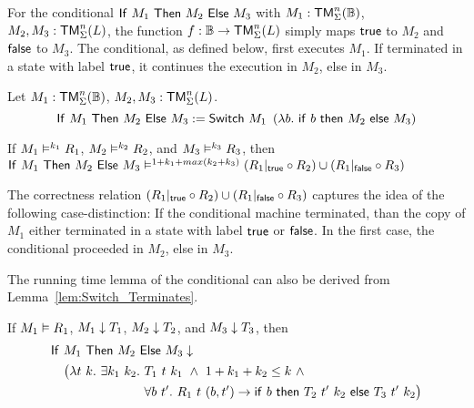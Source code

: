 For the conditional $\mathsf{If}~M_1~\mathsf{Then}~M_2~\mathsf{Else}~M_3$ with $M_1 : \mathsf{TM}_\Sigma^n(\mathbb{B})$, $M_2, M_3 : \mathsf{TM}_\Sigma^n(L)$, the function $f : \mathbb{B} \rightarrow \mathsf{TM}_\Sigma^n(L)$
simply maps $\mathsf{true}$ to $M_2$ and $\mathsf{false}$ to $M_3$.  The conditional, as defined below, first executes $M_1$.  If terminated in a state with label
$\mathsf{true}$, it continues the execution in $M_2$, else in $M_3$.

%
\begin{definition}[Conditional][If]
  \label{def:If}
  Let $M_1 : \mathsf{TM}_\Sigma^n(\mathbb{B})$, $M_2, M_3 : \mathsf{TM}_\Sigma^n(L)$.
  \[
    \mathsf{If}~M_1~\mathsf{Then}~M_2~\mathsf{Else}~M_3 := \mathsf{Switch}~M_1~
    \left(\lambda b.~\mathsf{if}~b~\mathsf{then}~M_2~\mathsf{else}~M_3 \right)
  \]
\end{definition}

\begin{lemma}
  \label{lem:If_RealiseIn}
  If $M_1 \mathrel{\vDash^{k_1}} R_1$, $M_2 \mathrel{\vDash^{k_2}} R_2$, and $M_3 \mathrel{\vDash^{k_3}} R_3$, then
  $
    \mathsf{If}~M_1~\mathsf{Then}~M_2~\mathsf{Else}~M_3 \mathrel{\vDash^{1+k_1+max(k_2+k_3)}} (R_1{|}_{\mathsf{true}} \circ R_2) \cup (R_1{|}_{\mathsf{false}} \circ R_3)
  $
\end{lemma}

The correctness relation $(R_1{|}_{\mathsf{true}} \circ R_2) \cup (R_1{|}_{\mathsf{false}} \circ R_3)$ captures the idea of the following case-distinction: If the
conditional machine terminated, than the copy of $M_1$ either terminated in a state with label $\mathsf{true}$ or $\mathsf{false}$.  In the first case, the
conditional proceeded in $M_2$, else in $M_3$.

The running time lemma of the conditional can also be derived from Lemma~\ref{lem:Switch_Terminates}.
\begin{lemma}
  \label{lem:If_TerminatesIn}
  If $M_1 \mathrel{\vDash} R_1$, $M_1 \mathrel{\downarrow} T_1$, $M_2 \mathrel{\downarrow} T_2$, and $M_3 \mathrel{\downarrow} T_3$, then
  \begin{align*}
    & \mathsf{If}~M_1~\mathsf{Then}~M_2~\mathsf{Else}~M_3 \mathrel{\downarrow} \\
    &\quad \bigl( \lambda t~k.~\exists k_1~k_2.~T_1~t~k_1 ~\land~ 1+k_1+k_2 \leq k ~\land~ \\
    &\quad \phantom{\bigl( \lambda t~k.~\exists k_1~k_2.}~\forall b~t'.~R_1~t~(b, t') \rightarrow \mathsf{if}~b~\mathsf{then}~T_2~t'~k_2~\mathsf{else}~T_3~t'~k_2 \bigr)
  \end{align*}
\end{lemma}


